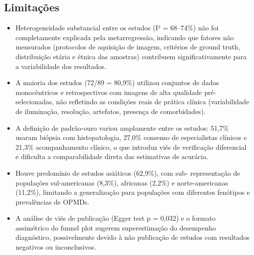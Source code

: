 \subsection{Limitações}
\begin{itemize}
  \item Heterogeneidade substancial entre os estudos (I² = 68--74\%)
        não foi completamente explicada pela metarregressão, indicando
        que fatores não mensurados (protocolos de aquisição de imagem,
        critérios de ground truth, distribuição etária e étnica das
        amostras) contribuem significativamente para a variabilidade
        dos resultados.
  \item A maioria dos estudos (72/89 = 80,9\%) utilizou conjuntos de
        dados monocêntricos e retrospectivos com imagens de alta
        qualidade pré-selecionadas, não refletindo as condições reais
        de prática clínica (variabilidade de iluminação, resolução,
        artefatos, presença de comorbidades).
  \item A definição de padrão-ouro variou amplamente entre os estudos:
        51,7\% usaram biópsia com histopatologia, 27,0\% consenso de
        especialistas clínicos e 21,3\% acompanhamento clínico, o que
        introduz viés de verificação diferencial e dificulta a
        comparabilidade direta das estimativas de acurácia.
  \item Houve predomínio de estudos asiáticos (62,9\%), com sub-
        representação de populações sul-americanas (8,3\%), africanas
        (2,2\%) e norte-americanas (11,2\%), limitando a generalização
        para populações com diferentes fenótipos e prevalências de
        OPMDs.
  \item A análise de viés de publicação (Egger test p = 0,032) e o
        formato assimétrico do funnel plot sugerem superestimação do
        desempenho diagnóstico, possivelmente devido à não publicação
        de estudos com resultados negativos ou inconclusivos.
\end{itemize}

